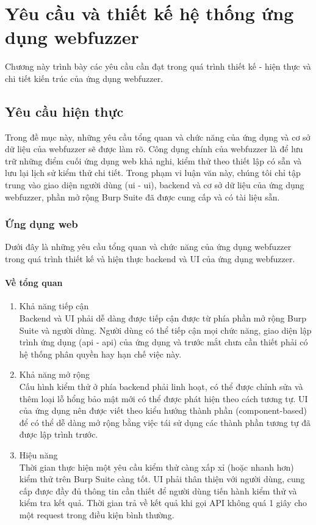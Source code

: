 \chapter{Yêu cầu và thiết kế hệ thống ứng dụng webfuzzer}
Chương này trình bày các yêu cầu cần đạt trong quá trình thiết kế - hiện thực và chi tiết kiến trúc của ứng dụng webfuzzer.
\section{Yêu cầu hiện thực}
Trong đề mục này, những yêu cầu tổng quan và chức năng của ứng dụng và cơ sở dữ liệu của webfuzzer sẽ được làm rõ. Công dụng chính của webfuzzer là để lưu trữ những điểm cuối ứng dụng web khả nghi, kiểm thử theo thiết lập có sẵn và lưu lại lịch sử kiểm thử chi tiết. Trong phạm vi luận văn này, chúng tôi chỉ tập trung vào giao diện người dùng (\acrlong{ui} - \acrshort{ui}), backend và cơ sở dữ liệu của ứng dụng webfuzzer, phần mở rộng Burp Suite đã được cung cấp và có tài liệu sẵn.
\subsection{Ứng dụng web}
Dưới đây là những yêu cầu tổng quan và chức năng của ứng dụng webfuzzer trong quá trình thiết kế và hiện thực backend và UI của ứng dụng webfuzzer.
\subsubsection{Về tổng quan}
\begin{enumerate}
    \item Khả năng tiếp cận\\
    Backend và UI phải dễ dàng được tiếp cận được từ phía phần mở rộng Burp Suite và người dùng. Người dùng có thể tiếp cận mọi chức năng, giao diện lập trình ứng dụng (\acrlong{api} - \acrshort{api}) của ứng dụng và trước mắt chưa cần thiết phải có hệ thống phân quyền hay hạn chế việc này.
    \item Khả năng mở rộng\\
    Cấu hình kiểm thử ở phía backend phải linh hoạt, có thể được chỉnh sửa và thêm loại lỗ hổng bảo mật mới có thể được phát hiện theo cách tương tự. UI của ứng dụng nên được viết theo kiểu hướng thành phần (component-based) để có thể dễ dàng mở rộng bằng việc tái sử dụng các thành phần tương tự đã được lập trình trước.
    \item Hiệu năng\\
    Thời gian thực hiện một yêu cầu kiểm thử càng xấp xỉ (hoặc nhanh hơn) kiểm thử trên Burp Suite càng tốt. UI phải thân thiện với người dùng, cung cấp được đầy đủ thông tin cần thiết để người dùng tiến hành kiểm thử và kiểm tra kết quả. Thời gian trả về kết quả khi gọi API không quá 1 giây cho một request trong điều kiện bình thường.
\end{enumerate}
